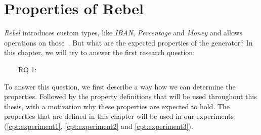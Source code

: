 \chapter{Properties of Rebel}
\label{cpt:properties}




\textit{Rebel} introduces custom types, like \textit{IBAN}, \textit{Percentage}
and \textit{Money} and allows operations on those~\cite{stoel2016solving}. But
what are the expected properties of the generator? In this chapter, we will try
to answer the first research question:
\begin{description}
	\item [~~~~RQ 1:] \rqOne
\end{description}
To answer this question, we first describe a way how we can determine the
properties. Followed by the property definitions that will be used throughout
this thesis, with a motivation why these properties are expected to hold. The
properties that are defined in this chapter will be used in our experiments
(\autoref{cpt:experiment1}, \autoref{cpt:experiment2} and
\autoref{cpt:experiment3}).


